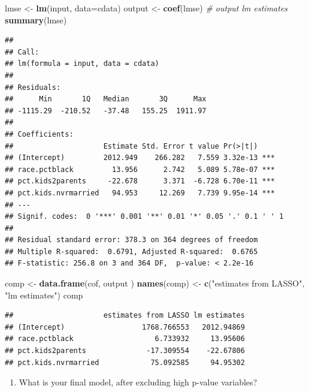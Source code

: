 \documentclass[]{article}
\newenvironment{Shaded}{\begin{snugshade}}{\end{snugshade}}
\newcommand{\KeywordTok}[1]{\textcolor[rgb]{0.13,0.29,0.53}{\textbf{#1}}}
\newcommand{\DataTypeTok}[1]{\textcolor[rgb]{0.13,0.29,0.53}{#1}}
\newcommand{\StringTok}[1]{\textcolor[rgb]{0.31,0.60,0.02}{#1}}
\newcommand{\CommentTok}[1]{\textcolor[rgb]{0.56,0.35,0.01}{\textit{#1}}}
\newcommand{\NormalTok}[1]{#1}
\providecommand{\tightlist}{%
  \setlength{\itemsep}{0pt}\setlength{\parskip}{0pt}}
\begin{document}
\begin{Shaded}
\begin{Highlighting}[]
\NormalTok{lmse <-}\StringTok{ }\KeywordTok{lm}\NormalTok{(input, }\DataTypeTok{data=}\NormalTok{cdata)}
\NormalTok{output <-}\StringTok{ }\KeywordTok{coef}\NormalTok{(lmse) }\CommentTok{# output lm estimates}
\KeywordTok{summary}\NormalTok{(lmse)}
\end{Highlighting}
\end{Shaded}

\begin{verbatim}
## 
## Call:
## lm(formula = input, data = cdata)
## 
## Residuals:
##      Min       1Q   Median       3Q      Max 
## -1115.29  -210.52   -37.48   155.25  1911.97 
## 
## Coefficients:
##                     Estimate Std. Error t value Pr(>|t|)    
## (Intercept)         2012.949    266.282   7.559 3.32e-13 ***
## race.pctblack         13.956      2.742   5.089 5.78e-07 ***
## pct.kids2parents     -22.678      3.371  -6.728 6.70e-11 ***
## pct.kids.nvrmarried   94.953     12.269   7.739 9.95e-14 ***
## ---
## Signif. codes:  0 '***' 0.001 '**' 0.01 '*' 0.05 '.' 0.1 ' ' 1
## 
## Residual standard error: 378.3 on 364 degrees of freedom
## Multiple R-squared:  0.6791, Adjusted R-squared:  0.6765 
## F-statistic: 256.8 on 3 and 364 DF,  p-value: < 2.2e-16
\end{verbatim}

\begin{Shaded}
\begin{Highlighting}[]
\NormalTok{comp <-}\StringTok{ }\KeywordTok{data.frame}\NormalTok{(cof, output )}
\KeywordTok{names}\NormalTok{(comp) <-}\StringTok{ }\KeywordTok{c}\NormalTok{(}\StringTok{"estimates from LASSO"}\NormalTok{, }\StringTok{"lm estimates"}\NormalTok{)}
\NormalTok{comp}
\end{Highlighting}
\end{Shaded}

\begin{verbatim}
##                     estimates from LASSO lm estimates
## (Intercept)                  1768.766553   2012.94869
## race.pctblack                   6.733932     13.95606
## pct.kids2parents              -17.309554    -22.67806
## pct.kids.nvrmarried            75.092585     94.95302
\end{verbatim}

\begin{enumerate}
\def\labelenumi{\arabic{enumi}.}
\setcounter{enumi}{2}
\tightlist
\item
  What is your final model, after excluding high p-value variables?
\end{enumerate}
\end{document}
